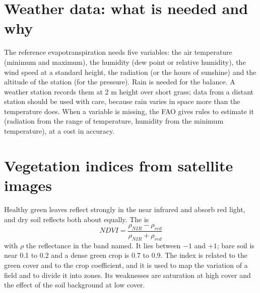 \section{Weather data: what is needed and why}
The reference evapotranspiration needs five variables: the air temperature (minimum and maximum), the humidity (dew point or relative humidity), the wind speed at a standard height, the radiation (or the hours of sunshine) and the altitude of the station (for the pressure). Rain is needed for the balance. A weather station records them at 2 m height over short grass; data from a distant station should be used with care, because rain varies in space more than the temperature does. When a variable is missing, the FAO gives rules to estimate it (radiation from the range of temperature, humidity from the minimum temperature), at a cost in accuracy.

\section{Vegetation indices from satellite images}
Healthy green leaves reflect strongly in the near infrared and absorb red light, and dry soil reflects both about equally. The  is
\begin{equation*}\boxed{NDVI=\frac{\rho_{NIR}-\rho_{red}}{\rho_{NIR}+\rho_{red}}}\end{equation*}
with $\rho$ the reflectance in the band named. It lies between $-1$ and $+1$; bare soil is near 0.1 to 0.2 and a dense green crop is 0.7 to 0.9. The index is related to the green cover and to the crop coefficient, and it is used to map the variation of a field and to divide it into zones. Its weaknesses are saturation at high cover and the effect of the soil background at low cover.
